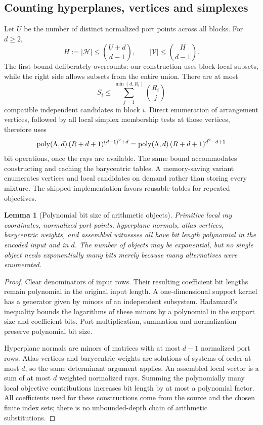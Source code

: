 \documentclass[11pt,a4paper]{article}
\newtheorem{lemma}[theorem]{Lemma}
\theoremstyle{definition}
\theoremstyle{remark}
\begin{document}
\subsection{Counting hyperplanes, vertices and simplexes}
Let $U$ be the number of distinct normalized port points across all blocks. For $d\ge2$,
\begin{equation}
 H:=|\mathcal H|\le\binom{U+d}{d-1},\qquad
 |\mathcal V|\le\binom H{d-1}.
 \label{eq:counts}
\end{equation}
The first bound deliberately overcounts: our construction uses block-local subsets, while the right side allows subsets from the entire union. There are at most
\[
 S_i\le\sum_{j=1}^{\min(d,R_i)}\binom{R_i}{j}
\]
compatible independent candidates in block $i$. Direct enumeration of arrangement vertices, followed by all local simplex membership tests at those vertices, therefore uses
\begin{equation}
 \operatorname{poly}(\Lambda,d)\,(R+d+1)^{(d-1)^2+d}
 =\operatorname{poly}(\Lambda,d)\,(R+d+1)^{d^2-d+1}
 \label{eq:ray-cost}
\end{equation}
bit operations, once the rays are available. The same bound accommodates constructing and caching the barycentric tables. A memory-saving variant enumerates vertices and local candidates on demand rather than storing every mixture. The shipped implementation favors reusable tables for repeated objectives.

\begin{lemma}[Polynomial bit size of arithmetic objects]
\label{lem:bits}
Primitive local ray coordinates, normalized port points, hyperplane normals, atlas vertices, barycentric weights, and assembled witnesses all have bit length polynomial in the encoded input and in $d$. The number of objects may be exponential, but no single object needs exponentially many bits merely because many alternatives were enumerated.
\end{lemma}
\begin{proof}
Clear denominators of input rows. Their resulting coefficient bit lengths remain polynomial in the original input length. A one-dimensional support kernel has a generator given by minors of an independent subsystem. Hadamard's inequality bounds the logarithms of these minors by a polynomial in the support size and coefficient bits. Port multiplication, summation and normalization preserve polynomial bit size.

Hyperplane normals are minors of matrices with at most $d-1$ normalized port rows. Atlas vertices and barycentric weights are solutions of systems of order at most $d$, so the same determinant argument applies. An assembled local vector is a sum of at most $d$ weighted normalized rays. Summing the polynomially many local objective contributions increases bit length by at most a polynomial factor. All coefficients used for these constructions come from the source and the chosen finite index sets; there is no unbounded-depth chain of arithmetic substitutions.
\end{proof}
\end{document}
